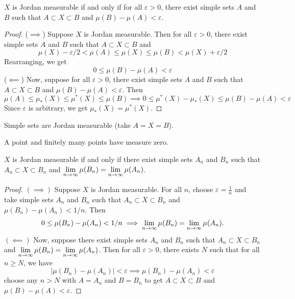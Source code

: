 \begin{theorem}
    $X$ is Jordan measurable if and only if for all $\varepsilon > 0$, there exist simple sets $A$ and $B$ such that $A\subset X \subset B$ and $\mu(B) - \mu(A) < \varepsilon$.
\end{theorem}
\begin{proof}
    ($\implies$) Suppose $X$ is Jordan measurable. Then for all $\varepsilon>0$, there exist simple sets $A$ and $B$ such that $A\subset X \subset B$ and
    \[
        \mu(X) - \varepsilon/2 < \mu(A) \le \mu(X) \le \mu(B) < \mu(X) + \varepsilon/2
    \]
    Rearranging, we get
    \[
        0 \le \mu(B) - \mu(A) <  \varepsilon
    \]
    ($\impliedby$) Now, suppose for all $\varepsilon>0$, there exist simple sets $A$ and $B$ such that $A\subset X \subset B$ and $\mu(B) - \mu(A) < \varepsilon$. Then
    \[
        \mu(A) \le \mu_*(X) \le \mu^*(X) \le \mu(B) \implies 0 \le \mu^*(X) - \mu_*(X) \le \mu(B) - \mu(A) < \varepsilon
    \]
    Since $\varepsilon$ is arbitrary, we get $\mu_*(X)=\mu^*(X)$.
\end{proof}

\begin{example}
    Simple sets are Jordan measurable (take $A=X=B$).
\end{example}

\begin{example}
    A point and finitely many points have measure zero.
\end{example}

\begin{theorem}
    $X$ is Jordan measurable if and only if there exist simple sets $A_n$ and $B_n$ such that $A_n \subset X \subset B_n$ and $\lim\limits_{n \to \infty} \mu(B_n) =\lim\limits_{n\to\infty}\mu(A_n)$.
\end{theorem}
\begin{proof}
    $(\implies)$ Suppose $X$ is Jordan measurable. For all $n$, choose $\varepsilon = \frac{1}{n}$ and take simple sets $A_n$ and $B_n$ such that $A_n \subset X \subset B_n$ and $\mu(B_n) - \mu(A_n) < 1/n$. Then
    \[
        0 \le \mu(B_n) - \mu(A_n) < 1/n \implies \lim\limits_{n\to\infty} \mu(B_n) =\lim\limits_{n\to\infty}\mu(A_n).
    \]
    $(\impliedby)$ Now, suppose there exist simple sets $A_n$ and $B_n$ such that $A_n \subset X \subset B_n$ and $\lim\limits_{n \to \infty} \mu(B_n) =\lim\limits_{n\to\infty}\mu(A_n)$. Then for all $\varepsilon>0$, there exists $N$ such that for all $n\ge N$, we have
    \[
        |\mu(B_n) - \mu(A_n)| < \varepsilon \implies \mu(B_n) - \mu(A_n) < \varepsilon
    \]
    choose any $n>N$ with $A = A_n$ and $B = B_n$ to get $A\subset X \subset B$ and $\mu(B) - \mu(A) < \varepsilon$.
\end{proof}

